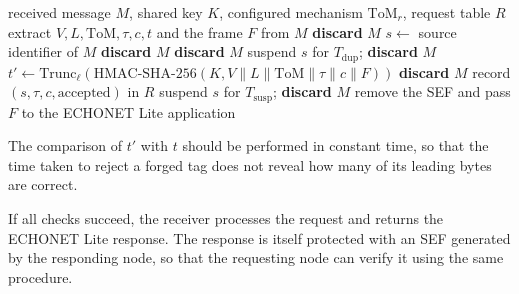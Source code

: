 \begin{algorithm}[htbp]
  \caption{ELAF message verification at the receiver}
  \label{alg:verify}
  \begin{algorithmic}[1]
    \Require received message $M$, shared key $K$, configured mechanism $\mathrm{ToM}_r$, request table $R$
    \State extract $V, L, \mathrm{ToM}, \tau, c, t$ and the frame $F$ from $M$
      \State \textbf{discard} $M$ 
    \EndIf
    \State $s \gets$ source identifier of $M$
      \State \textbf{discard} $M$ 
    \EndIf
      \State \textbf{discard} $M$ 
    \EndIf
      \State suspend $s$ for $T_{\mathrm{dup}}$; \textbf{discard} $M$ 
    \EndIf
    \State $t' \gets \mathrm{Trunc}_{\ell}(\mathrm{HMAC\text{-}SHA\text{-}256}(K, V \| L \| \mathrm{ToM} \| \tau \| c \| F))$
      \State \textbf{discard} $M$ 
    \EndIf
    \State record $(s, \tau, c, \text{accepted})$ in $R$
      \State suspend $s$ for $T_{\mathrm{susp}}$; \textbf{discard} $M$ 
    \EndIf
    \State remove the SEF and pass $F$ to the ECHONET Lite application
  \end{algorithmic}
\end{algorithm}

The comparison of $t'$ with $t$ should be performed in constant time, so that the time taken to reject a forged tag does not reveal how many of its leading bytes are correct.

If all checks succeed, the receiver processes the request and returns the ECHONET Lite response. The response is itself protected with an SEF generated by the responding node, so that the requesting node can verify it using the same procedure.

